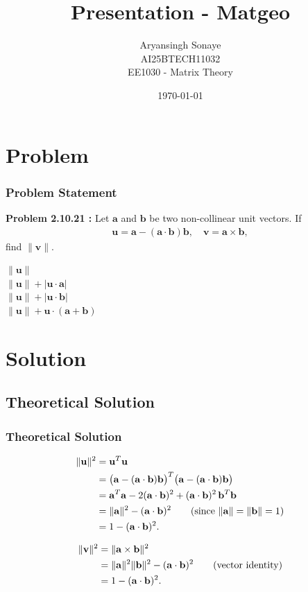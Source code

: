 \documentclass{beamer}
\title{Presentation - Matgeo}
\author{Aryansingh Sonaye \\
AI25BTECH11032 \\
EE1030 - Matrix Theory}
\date{\today}
\theoremstyle{remark}
\let\vec\mathbf
\numberwithin{equation}{section}
\begin{document}
\begin{frame}
\titlepage
\end{frame}

\section{Problem}
\begin{frame}
\frametitle{Problem Statement}
\noindent\textbf{Problem 2.10.21 :}  
Let $\vec{a}$ and $\vec{b}$ be two non-collinear unit vectors. If  
\begin{align}
\vec{u} = \vec{a} - (\vec{a}\cdot \vec{b})\vec{b}, 
\quad 
\vec{v} = \vec{a} \times \vec{b},
\end{align}
find $\|\vec{v}\|$.


\; $\|\vec{u}\|$ \\
\; $\|\vec{u}\| + |\vec{u}\cdot \vec{a}|$ \\
\; $\|\vec{u}\| + |\vec{u}\cdot \vec{b}|$ \\
\; $\|\vec{u}\| + \vec{u}\cdot(\vec{a}+\vec{b})$
\end{frame}

\section{Solution}

\subsection{Theoretical Solution }
\begin{frame}
\frametitle{Theoretical Solution}
\begin{align}
\|\vec{u}\|^2 
&= \vec{u}^T \vec{u} \notag \\
&= \big(\vec{a} - (\vec{a}\cdot\vec{b})\vec{b}\big)^T 
   \big(\vec{a} - (\vec{a}\cdot\vec{b})\vec{b}\big) \notag \\
&= \vec{a}^T\vec{a} - 2(\vec{a}\cdot\vec{b})^2 + (\vec{a}\cdot\vec{b})^2 \,\vec{b}^T\vec{b} \notag \\
&= \|\vec{a}\|^2 - (\vec{a}\cdot\vec{b})^2 
   \qquad (\text{since }\|\vec{a}\|=\|\vec{b}\|=1) \notag \\
&= 1 - (\vec{a}\cdot\vec{b})^2.
\end{align}

\begin{align}
\|\vec{v}\|^2 
&= \|\vec{a}\times\vec{b}\|^2 \notag \\
&= \|\vec{a}\|^2 \|\vec{b}\|^2 - (\vec{a}\cdot\vec{b})^2 
   \qquad (\text{vector identity}) \notag \\
&= 1 - (\vec{a}\cdot\vec{b})^2.
\end{align}
\end{frame}
\end{document}
